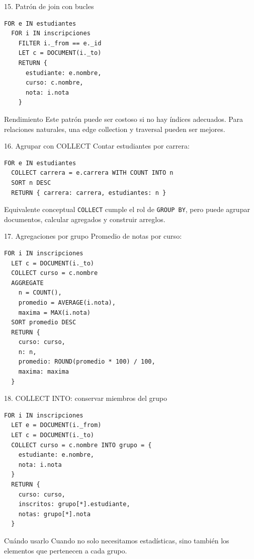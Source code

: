 \documentclass[aspectratio=169,11pt]{beamer}
\begin{document}
\begin{frame}[fragile]{15. Patrón de join con bucles}
\begin{lstlisting}
FOR e IN estudiantes
  FOR i IN inscripciones
    FILTER i._from == e._id
    LET c = DOCUMENT(i._to)
    RETURN {
      estudiante: e.nombre,
      curso: c.nombre,
      nota: i.nota
    }
\end{lstlisting}

\begin{alertblock}{Rendimiento}
Este patrón puede ser costoso si no hay índices adecuados. Para relaciones naturales, una edge collection y traversal pueden ser mejores.
\end{alertblock}
\end{frame}

\begin{frame}[fragile]{16. Agrupar con COLLECT}
Contar estudiantes por carrera:

\begin{lstlisting}
FOR e IN estudiantes
  COLLECT carrera = e.carrera WITH COUNT INTO n
  SORT n DESC
  RETURN { carrera: carrera, estudiantes: n }
\end{lstlisting}

\vspace{0.25cm}
\begin{block}{Equivalente conceptual}
\texttt{COLLECT} cumple el rol de \texttt{GROUP BY}, pero puede agrupar documentos, calcular agregados y construir arreglos.
\end{block}
\end{frame}

\begin{frame}[fragile]{17. Agregaciones por grupo}
Promedio de notas por curso:

\begin{lstlisting}
FOR i IN inscripciones
  LET c = DOCUMENT(i._to)
  COLLECT curso = c.nombre
  AGGREGATE
    n = COUNT(),
    promedio = AVERAGE(i.nota),
    maxima = MAX(i.nota)
  SORT promedio DESC
  RETURN {
    curso: curso,
    n: n,
    promedio: ROUND(promedio * 100) / 100,
    maxima: maxima
  }
\end{lstlisting}
\end{frame}

\begin{frame}[fragile]{18. COLLECT INTO: conservar miembros del grupo}
\begin{lstlisting}
FOR i IN inscripciones
  LET e = DOCUMENT(i._from)
  LET c = DOCUMENT(i._to)
  COLLECT curso = c.nombre INTO grupo = {
    estudiante: e.nombre,
    nota: i.nota
  }
  RETURN {
    curso: curso,
    inscritos: grupo[*].estudiante,
    notas: grupo[*].nota
  }
\end{lstlisting}

\begin{block}{Cuándo usarlo}
Cuando no solo necesitamos estadísticas, sino también los elementos que pertenecen a cada grupo.
\end{block}
\end{frame}
\end{document}
